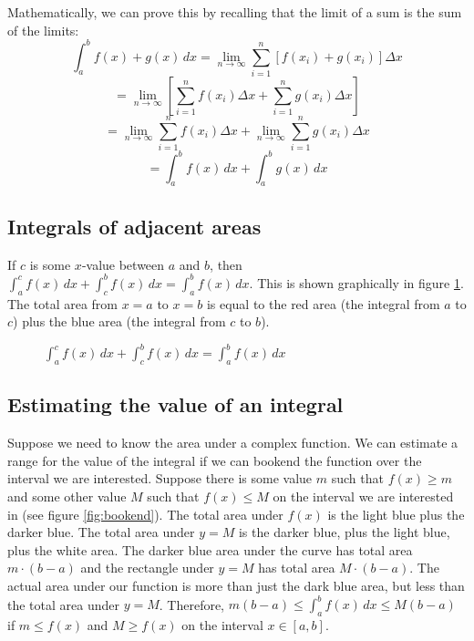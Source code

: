 Mathematically, we can prove this by recalling that the limit of a 
sum is the sum of the limits: $$\int_a^b f(x) + g(x)\,dx = 
\lim_{n \to \infty} \sum_{i=1}^n [f(x_i)+g(x_i)]\Delta x$$ 
$$=\lim_{n \to \infty} [\sum_{i=1}^n f(x_i)\Delta x + \sum_{i = 1}^n 
g(x_i) \Delta x]$$ $$= \lim_{n \to \infty}\sum_{i=1}^n f(x_i)\Delta 
x + \lim_{n \to \infty} \sum_{i = 1}^n g(x_i) \Delta x$$ $$ = 
\int_a^b f(x)\,dx + \int_a^b g(x)\,dx$$

\subsection{Integrals of adjacent areas}
If $c$ is some $x$-value between $a$ and $b$, then $\int_a^c f(x)\,dx 
+ \int_c^b f(x)\,dx = \int_a^b f(x)\,dx$. This is shown graphically in 
figure \ref{fig:adjacent}. The total area from $x=a$ to $x=b$ is equal 
to the red area (the integral from $a$ to $c$) plus the blue area (the 
integral from $c$ to $b$). 

\begin{figure}[htbp]
	\centering
	\caption{$\int_a^c f(x)\,dx + \int_c^b f(x)\,dx = \int_a^b f(x)\,dx$}
	\label{fig:adjacent}
\end{figure}

\subsection{Estimating the value of an integral}
Suppose we need to know the area under a complex function. We can 
estimate a range for the value of the integral if we can bookend the 
function over the interval we are interested. Suppose there is some 
value $m$ such that $f(x) \geq m$ and some other value $M$ such that 
$f(x) \leq M$ on the interval we are interested in (see figure 
\ref{fig:bookend}). The total area under $f(x)$ is the light blue 
plus the darker blue. The total area under $y=M$ is the darker blue, 
plus the light blue, plus the white area. The darker blue area under 
the curve has total area $m \cdot (b - a)$ and the rectangle under 
$y=M$ has total area $M \cdot (b - a)$. The actual area under our 
function is more than just the dark blue area, but less than the total 
area under $y=M$. Therefore, $m(b - a) \leq \int_a^b f(x)\,dx \leq 
M(b -a)$ if $m \leq f(x)$ and $M \geq f(x)$ on the interval $x \in 
[a, b]$. 

